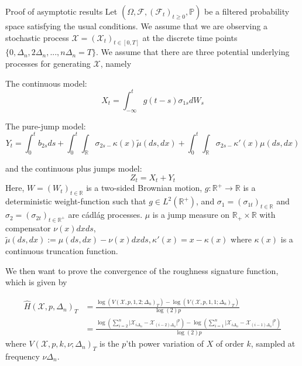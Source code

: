\documentclass[fleqn,11pt,letterpaper]{article}
\theoremstyle{plain}
\theoremstyle{definition}
\theoremstyle{remark}
\numberwithin{equation}{section}
\begin{document}
\pagebreak
\appendix
\begin{section}{Proof of asymptotic results}\label{appendix:proofs}
Let $(\Omega,\mathcal{F},(\mathcal{F}_t)_{t\geq0},\mathbb{P})$ be a filtered probability space satisfying the usual conditions. We assume that we are observing a stochastic process $\mathcal{X}=(\mathcal{X}_t)_{t\in[0,T]}$ at the discrete time points $\{0,\Delta_n,2\Delta_n,...,n\Delta_n = T\}$. We assume that there are three potential underlying processes for generating $\mathcal{X}$, namely 


The continuous model: 
\begin{equation} \label{eq:cont_model}
    X_{t}=\int_{-\infty}^{t}g(t-s)\sigma_{1s}dW_s
\end{equation}

The pure-jump model: 
\begin{equation} \label{eq:jump_model}
    Y_{t}=\int_{0}^{t}b_{2s}ds+\int_{0}^{t}\int_{\mathbb{R}}\sigma_{2s-}\kappa(x)\tilde{\mu}(ds,dx)+\int_{0}^{t}\int_{\mathbb{R}}\sigma_{2s-}\kappa'(x)\mu(ds,dx)
\end{equation}

and the continuous plus jumps model: 
\begin{equation} \label{eq:cont_jump_model}
    Z_{t}=X_{t}+Y_{t}
\end{equation}
Here, $W=(W_t)_{t\in\mathbb{R}}$ is a two-sided Brownian motion, $g:\mathbb{R}^+\to\mathbb{R}$ is a deterministic weight-function such that $g\in L^2(\mathbb{R}^+)$, and $\sigma_1=(\sigma_{1t})_{t\in\mathbb{R}}$ and $\sigma_2=(\sigma_{2t})_{t\in\mathbb{R}^+}$ are cádlág processes. $\mu$ is a jump measure on $\mathbb{R}_{+}\times\mathbb{R}$ with compensator $\nu(x)dxds$, $\tilde{\mu}(ds,dx):=\mu(ds,dx)-\nu(x)dxds, \kappa'(x)=x-\kappa(x)$ where $\kappa(x)$ is a continuous truncation function.

We then want to prove the convergence of the roughness signature function, which is given by 

\begin{equation}\label{eq:cof_expr}
    \begin{split}
        \hat{H}(\mathcal{X},p,\Delta_n)_T &= \frac{\log(V(\mathcal{X},p,1,2;\Delta_n)_T) - \log(V(\mathcal{X},p,1,1;\Delta_n)_T)}{\log(2)p} \\
        &=  \frac{\log(\sum_{i=2}^n\vert \mathcal{X}_{i\Delta_n}-\mathcal{X}_{(i-2)\Delta_n}\vert^p)-\log(\sum_{i=1}^n\vert \mathcal{X}_{i\Delta_n} - \mathcal{X}_{(i-1)\Delta_n}\vert^p)}{\log(2)p}
    \end{split}
\end{equation}
where $V(\mathcal{X},p,k,\nu;\Delta_n)_T$ is the $p$'th power variation of $X$ of order $k$, sampled at frequency $\nu\Delta_n$. 


\end{section}
\end{document}
